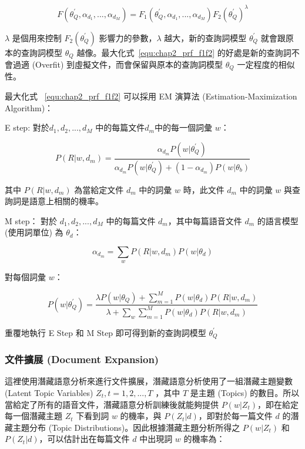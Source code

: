 \begin{equation}
\label{equ:chap2_prf_f1f2}
F(\theta_Q^{'}, \alpha_{d_1}, ..., \alpha_{d_M}) = F_1(\theta_Q^{'}, \alpha_{d_1}, ..., \alpha_{d_M}) F_2(\theta_Q^{'})^\lambda
\end{equation}

$\lambda$ 是個用來控制 $F_2(\theta_Q^{'})$ 影響力的參數，$\lambda$ 越大，新的查詢詞模型 $\theta_Q^{'}$ 就會跟原本的查詢詞模型 $\theta_Q$ 越像。最大化式~\ref{equ:chap2_prf_f1f2} 的好處是新的查詢詞不會過適 (Overfit) 到虛擬文件，而會保留與原本的查詢詞模型 $\theta_Q$ 一定程度的相似性。	

最大化式 ~\ref{equ:chap2_prf_f1f2} 可以採用 EM 演算法 (Estimation-Maximization Algorithm)：

E step: 對於${d_1, d_2, ..., d_M}$ 中的每篇文件$d_m$中的每一個詞彙 $w$：

\begin{equation}
\label{equ:chap2_prf_estep}
P(R|w, d_m) = \frac{\alpha_{d_m} P(w|\theta_Q^{'})}{\alpha_{d_m} P(w|\theta_Q^{'}) + (1-\alpha_{d_m}) P(w|\theta_b)}
\end{equation}

其中 $P(R|w, d_m)$ 為當給定文件 $d_m$ 中的詞彙 $w$ 時，此文件 $d_m$ 中的詞彙 $w$ 與查詢詞是語意上相關的機率。 

M step： 對於 ${d_1, d_2, ..., d_M}$ 中的每篇文件 $d_m$，其中每篇語音文件 $d_m$ 的語言模型 (使用詞單位) 為 $\theta_d$：

\begin{equation}
\label{equ:chap2_prf_mstep}
\alpha_{d_m} = \sum_w P(R|w, d_m)P(w|\theta_d)
\end{equation}

對每個詞彙 $w$：

\begin{equation}
P(w|\theta_Q^{'}) = \frac{\lambda P(w|\theta_Q)+\sum^M_{m=1} P(w|\theta_d) P(R|w, d_m)}{\lambda + \sum_w \sum^M_{m=1} P(w|\theta_d) P(R|w, d_m)}
\end{equation}

重覆地執行 E Step 和 M Step 即可得到新的查詢詞模型 $\theta_Q^{'}$

\subsubsection{文件擴展 (Document Expansion)}
\label{sec:doc_exp}
這裡使用潛藏語意分析來進行文件擴展，潛藏語意分析使用了一組潛藏主題變數 (Latent Topic Variables) ${Z_t, t = 1, 2, ..., T}$ ，其中 $T$ 是主題 (Topics) 的數目。所以當給定了所有的語音文件，潛藏語意分析訓練後就能夠提供 $P(w|Z_t)$，即在給定每一個潛藏主題 $Z_t$ 下看到詞 $w$ 的機率，與 $P(Z_t|d)$，即對於每一篇文件 $d$ 的潛藏主題分布 (Topic Distributions)。因此根據潛藏主題分析所得之 $P(w|Z_t)$ 和 $P(Z_t|d)$，可以估計出在每篇文件 $d$ 中出現詞 $w$ 的機率為：

